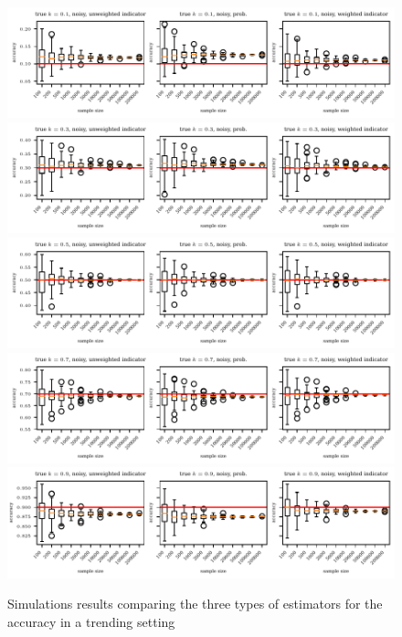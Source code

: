 \documentclass[oneside]{article}
\theoremstyle{plain}%
\theoremstyle{definition}
\begin{document}
\begin{figure}
  \centering
	\includegraphics{plots/unbiasedness/boxplot_k_0.1.pdf}
	\includegraphics{plots/unbiasedness/boxplot_k_0.3.pdf}
	\includegraphics{plots/unbiasedness/boxplot_k_0.5.pdf}
	\includegraphics{plots/unbiasedness/boxplot_k_0.7.pdf}
	\includegraphics{plots/unbiasedness/boxplot_k_0.9.pdf}			
  \caption{Simulations results comparing the three types of estimators for the accuracy in a trending setting}
  \label{fig:comparison_estimators}
\end{figure}
\end{document}
